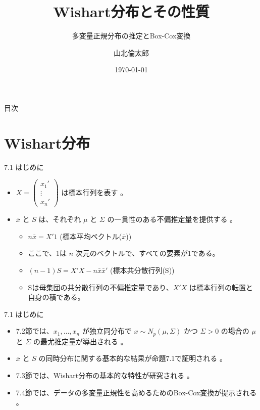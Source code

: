 \documentclass[aspectratio=169]{beamer}
\title{Wishart分布とその性質}
\subtitle{多変量正規分布の推定とBox-Cox変換}
\author{山北倫太郎}
\date{\today}
\begin{document}

\begin{frame}
\titlepage
\end{frame}

\begin{frame}{目次}
\tableofcontents
\end{frame}

\section{Wishart分布}

\begin{frame}{7.1 はじめに}
\begin{itemize}
    \item $X=\begin{pmatrix}x_1' \\ \vdots \\ x_n'\end{pmatrix}$ は標本行列を表す 。
    \item $\bar{x}$ と $S$ は、それぞれ $\mu$ と $\Sigma$ の一貫性のある不偏推定量を提供する 。
    \begin{itemize}
        \item $n\bar{x}=X'1$ (標本平均ベクトル($\bar{x}$))
        \item ここで、1は $n$ 次元のベクトルで、すべての要素が1である。\\
        \item $(n-1)S=X'X-n\bar{x}\bar{x}'$ (標本共分散行列(S))
        \item Sは母集団の共分散行列の不偏推定量であり、$X'X$ は標本行列の転置と自身の積である。
    \end{itemize}

\end{itemize}
\end{frame}
\begin{frame}{7.1 はじめに}
\begin{itemize}
    \item 7.2節では、$x_1, \dots, x_n$ が独立同分布で $x \sim N_p(\mu, \Sigma)$ かつ $\Sigma>0$ の場合の $\mu$ と $\Sigma$ の最尤推定量が導出される 。
    \item $\bar{x}$ と $S$ の同時分布に関する基本的な結果が命題7.1で証明される 。
    \item 7.3節では、Wishart分布の基本的な特性が研究される 。
    \item 7.4節では、データの多変量正規性を高めるためのBox-Cox変換が提示される 。
\end{itemize}
\end{frame}
\end{document}
